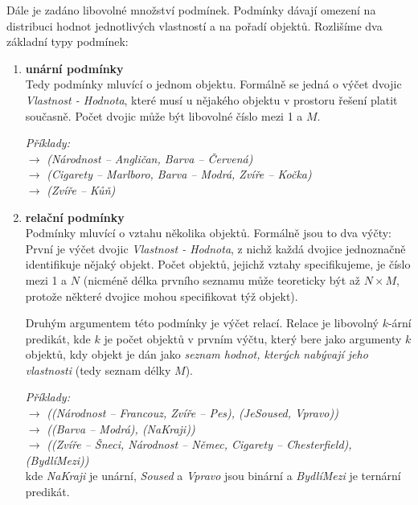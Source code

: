 \documentclass[11pt]{article} %
\begin{document}
Dále je zadáno libovolné množství podmínek. Podmínky dávají omezení na distribuci hodnot jednotlivých vlastností a na pořadí objektů. Rozlišíme dva základní typy podmínek:
\begin{enumerate}
\item \textbf{unární podmínky} \\
Tedy podmínky mluvící o jednom objektu. Formálně se jedná o výčet dvojic \emph{Vlastnost - Hodnota}, které musí u nějakého objektu v prostoru řešení platit současně. Počet dvojic může být libovolné číslo mezi 1 a $M$. 

\emph{Příklady:} \\
  $\rightarrow$ \emph{(Národnost -- Angličan, Barva -- Červená)}\\
 $\rightarrow$  \emph{(Cigarety -- Marlboro, Barva -- Modrá, Zvíře -- Kočka)} \\
 $\rightarrow$ \emph{(Zvíře -- Kůň)}
\item \textbf{relační podmínky} \\
Podmínky mluvící o vztahu několika objektů. Formálně jsou to dva výčty: První je výčet dvojic \emph{Vlastnost - Hodnota}, z nichž každá dvojice jednoznačně identifikuje nějaký objekt. Počet objektů, jejichž vztahy specifikujeme, je číslo mezi 1 a $N$ (nicméně délka prvního seznamu může teoreticky být až $N \times M$, protože některé dvojice mohou specifikovat týž objekt).

Druhým argumentem této podmínky je výčet relací. Relace je libovolný $k$-ární predikát, kde $k$ je počet objektů v prvním výčtu, který bere jako argumenty $k$ objektů, kdy objekt je dán jako \emph{seznam hodnot, kterých nabývají jeho vlastnosti} (tedy seznam délky $M$).  

\emph{Příklady:} \\
 $\rightarrow$ \emph{((Národnost -- Francouz, Zvíře -- Pes), (JeSoused, Vpravo))}\\
 $\rightarrow$ \emph{((Barva -- Modrá), (NaKraji))}\\
 $\rightarrow$ \emph{((Zvíře -- Šneci, Národnost -- Němec, Cigarety -- Chesterfield), (BydlíMezi))} \\

kde \emph{NaKraji} je unární, \emph{Soused} a \emph{Vpravo} jsou binární a \emph{BydlíMezi} je ternární predikát.
\end{enumerate}
\end{document}
